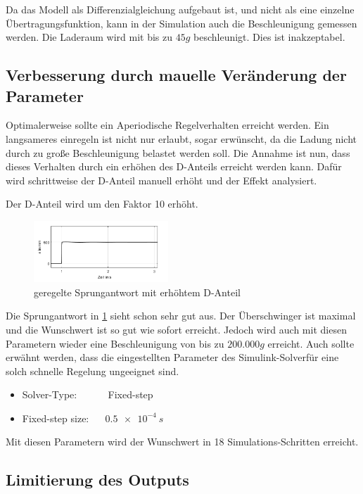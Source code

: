 Da das Modell als Differenzialgleichung aufgebaut ist, und nicht als eine einzelne Übertragungsfunktion, kann in der Simulation auch die Beschleunigung gemessen werden.
Die Laderaum wird mit bis zu $45g $ beschleunigt.
Dies ist inakzeptabel.

\subsection{Verbesserung durch mauelle Veränderung der Parameter}
Optimalerweise sollte ein Aperiodische Regelverhalten erreicht werden. Ein langsameres einregeln ist nicht nur erlaubt, sogar erwünscht,
da die Ladung nicht durch zu große Beschleunigung belastet werden soll.
Die Annahme ist nun, dass dieses Verhalten durch ein erhöhen des D-Anteils erreicht werden kann.
Dafür wird schrittweise der D-Anteil manuell erhöht und der Effekt analysiert.

Der D-Anteil wird um den Faktor 10 erhöht.

\begin{figure}[h] 
	\centering
		\includegraphics[width=0.45\textwidth]{Bilder/D-Anteilx10.png}
	\caption{geregelte Sprungantwort mit erhöhtem D-Anteil}
	\label{geregelteSprungantwortDx10}
\end{figure}

Die Sprungantwort in \ref{geregelteSprungantwortDx10} sieht schon sehr gut aus.
Der Überschwinger ist maximal und die Wunschwert ist so gut wie sofort erreicht.
Jedoch wird auch mit diesen Parametern wieder eine Beschleunigung von bis zu $200.000 g$ erreicht.
Auch sollte erwähnt werden, dass die eingestellten Parameter des \glqq Simulink-Solver\grqq  für eine solch schnelle Regelung ungeeignet sind.

\begin{itemize}
	\item Solver-Type:   ~~~~~   Fixed-step
	\item Fixed-step size: ~~ $\SI{0,5e-4}{s}$	
\end{itemize}


Mit diesen Parametern wird der Wunschwert in 18 Simulations-Schritten erreicht.

\subsection{Limitierung des Outputs}

